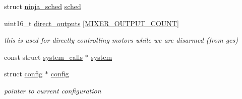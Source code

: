 \begin{DoxyCompactItemize}
\item 
struct \hyperlink{structninja__sched}{ninja\+\_\+sched} \hyperlink{structninja_a7ccd139def1612b83eea1481ff322112}{sched}
\item 
uint16\+\_\+t \hyperlink{structninja_a980dd1682714d182924bfc3215442739}{direct\+\_\+outputs} \mbox{[}\hyperlink{config_2mixer_8h_a05cc0d282b354702363e82bf33fcfea2a854b4d34a2cca19f8b7357baadb1e95d}{M\+I\+X\+E\+R\+\_\+\+O\+U\+T\+P\+U\+T\+\_\+\+C\+O\+U\+N\+T}\mbox{]}
\begin{DoxyCompactList}\small\item\em this is used for directly controlling motors while we are disarmed (from gcs) \end{DoxyCompactList}\item 
const struct \hyperlink{structsystem__calls}{system\+\_\+calls} $\ast$ \hyperlink{structninja_ae1be21982288780db80754039eedfd94}{system}
\item 
struct \hyperlink{structconfig}{config} $\ast$ \hyperlink{structninja_a060c836bd8d8a6653d07fd59a7dd59e1}{config}
\begin{DoxyCompactList}\small\item\em pointer to current configuration \end{DoxyCompactList}\end{DoxyCompactItemize}


